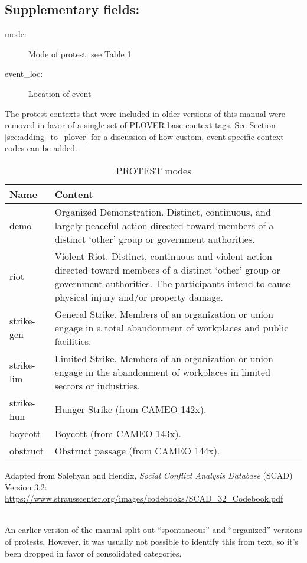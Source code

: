 \documentclass[11pt]{report}
\begin{document}
\subsection{Supplementary fields:}

\begin{description}
	\item[mode:] Mode of protest: see Table \ref{tab:protestmode} 
	\item[event\_loc:] Location of event 
\end{description}

The protest contexts that were included in older versions of this manual were removed in favor of a single set of PLOVER-base context tags. See Section \ref{sec:adding_to_plover} for a discussion of how custom, event-specific context codes can be added.




\begin{table}[htp]
\caption{PROTEST modes}
\begin{center}
\begin{tabular}{|l|p{13cm}|}
\hline
Name & Content \\
\hline
demo & Organized Demonstration. Distinct, continuous, and largely peaceful action directed toward
members of a distinct `other' group or government authorities.  \\
riot & Violent Riot. Distinct, continuous and violent action directed toward members of
a distinct `other' group or government authorities. The participants intend to cause physical injury and/or property damage. \\
strike-gen & General Strike. Members of an organization or union engage in a total abandonment of
workplaces and public facilities.\\
strike-lim & Limited Strike. Members of an organization or union engage in the abandonment of
workplaces in limited sectors or industries.\\
strike-hun & Hunger Strike (from CAMEO 142x).\\
boycott & Boycott (from CAMEO 143x).\\
obstruct & Obstruct passage (from CAMEO 144x).\\
\hline
\end{tabular}
\end{center}
\label{tab:protestmode}
\raggedright{Adapted from Salehyan and Hendix, \textit{Social Conflict Analysis Database} (SCAD)
Version 3.2: \url{https://www.strausscenter.org/images/codebooks/SCAD\_32\_Codebook.pdf}}\\~

An earlier version of the manual split out ``spontaneous'' and ``organized'' versions of protests. However, it was usually not possible to identify this from text, so it's been dropped in favor of consolidated categories.
\end{table}%
\end{document}
